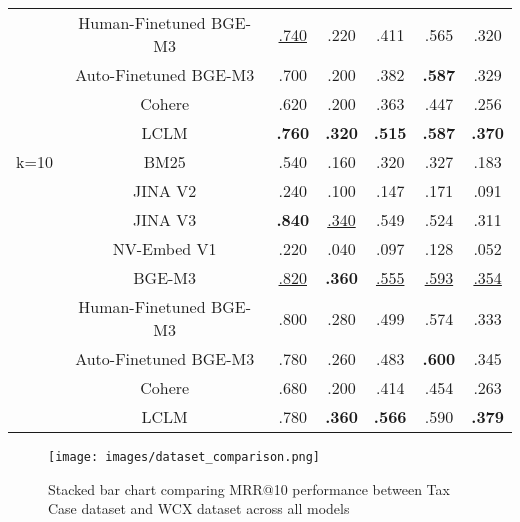 \begin{table}[ht]
\begin{tabular}{@{}ccccccc@{}}
      & Human-Finetuned BGE-M3 & \underline{.740}    & .220          & .411          & .565          & .320          \\
      & Auto-Finetuned BGE-M3  & .700          & .200          & .382          & \textbf{.587} & .329          \\
      & Cohere                 & .620          & .200          & .363          & .447          & .256          \\
      & LCLM                   & \textbf{.760} & \textbf{.320} & \textbf{.515} & \textbf{.587} & \textbf{.370} \\ \midrule
k=10  & BM25                   & .540          & .160          & .320          & .327          & .183          \\
      & JINA V2                & .240          & .100          & .147          & .171          & .091          \\
      & JINA V3                & \textbf{.840} & \underline{.340}    & .549          & .524          & .311          \\
      & NV-Embed V1            & .220          & .040          & .097          & .128          & .052          \\
      & BGE-M3                 & \underline{.820}    & \textbf{.360} & \underline{.555}    & \underline{.593}    & \underline{.354}    \\
      & Human-Finetuned BGE-M3 & .800          & .280          & .499          & .574          & .333          \\
      & Auto-Finetuned BGE-M3  & .780          & .260          & .483          & \textbf{.600} & .345          \\
      & Cohere                 & .680          & .200          & .414          & .454          & .263          \\
      & LCLM                   & .780          & \textbf{.360} & \textbf{.566} & .590          & \textbf{.379} \\ \bottomrule
\end{tabular}
\end{table}

\begin{figure}[ht]
  \centering
  \texttt{[image: images/dataset\_comparison.png]}
  \caption{Stacked bar chart comparing MRR@10 performance between Tax Case dataset and WCX dataset across all models}
  \label{fig: tax_mrr_vs_wanchan}
\end{figure}


